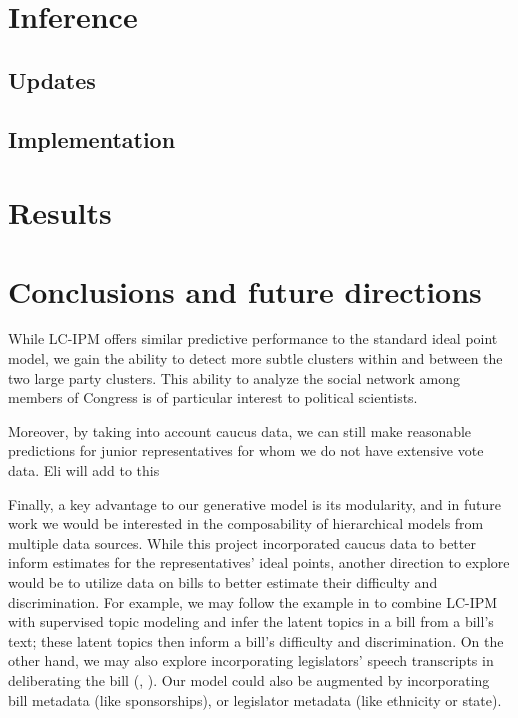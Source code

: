\documentclass{article}
\begin{document}
\newpage

\section{Inference}
\label{inference}

\subsection{Updates}



\subsection{Implementation}

\newpage

\section{Results}
\label{results}

\section{Conclusions and future directions} 
While LC-IPM offers similar predictive performance to the standard ideal point model, we gain the ability to detect more subtle clusters within and between the two large party clusters. This ability to analyze the social network among members of Congress is of particular interest to political scientists. \par

Moreover, by taking into account caucus data, we can still make reasonable predictions for junior representatives for whom we do not have extensive vote data.  {\color{red} Eli will add to this}  \par

Finally, a key advantage to our generative model is its modularity, and in future work we would be interested in the composability of hierarchical models from multiple data sources. While this project incorporated caucus data to better inform estimates for the representatives' ideal points, another direction to explore would be to utilize data on bills to better estimate their difficulty and discrimination. For example, we may follow the example in \cite{Gerrish2011} to combine LC-IPM with supervised topic modeling and infer the latent topics in a bill from a bill's text; these latent topics then inform a bill's difficulty and discrimination. On the other hand, we may also explore incorporating legislators' speech transcripts in deliberating the bill (\cite{Quinn2006}, \cite{Thomas2006}). Our model could also be augmented by incorporating bill metadata (like sponsorships), or legislator metadata (like ethnicity or state). \par
\end{document}
